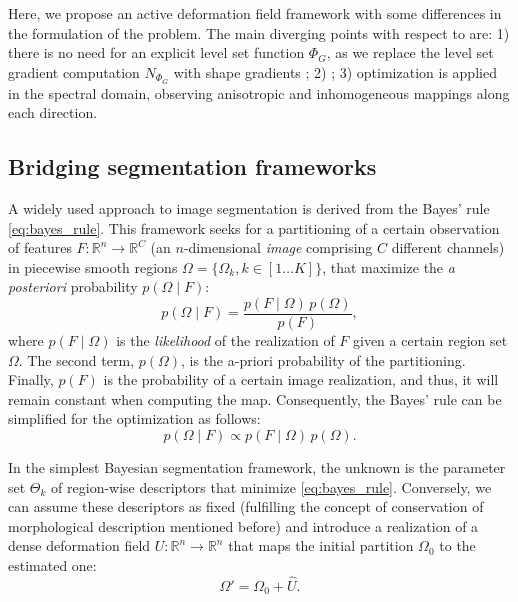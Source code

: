 Here, we propose an active deformation field framework with some differences in
the formulation of the problem. The main diverging points with respect to
\citep{gorthi_active_2011} are: 1) there is no need for an explicit level set function
$\Phi_G$, as we replace the level set gradient computation $N_{\Phi_G}$ with shape
gradients \citep{jehan-besson_dream2s:_2003,herbulot_segmentation_2006}; 2) 
; 3) optimization is applied in the spectral
domain, observing anisotropic and inhomogeneous mappings along each direction.


\subsection{Bridging segmentation frameworks}
\label{sec:methods_map}
%
A widely used approach to image segmentation is derived from the
Bayes' rule \eqref{eq:bayes_rule}. This framework seeks for a 
partitioning of a certain observation of features $F: \mathbb{R}^n \to %
\mathbb{R}^C$ (an $n$-dimensional \emph{image} comprising $C$ different 
channels) in piecewise smooth regions $\Omega = \lbrace \Omega_k , 
k\in\left[ 1 \ldots K \right] \rbrace$,  that maximize the \emph{a posteriori}
probability $p(\Omega \mid F)$:
\begin{equation}
p(\Omega \mid F) = \frac{p(F \mid \Omega)\, p(\Omega)}{p(F)},
\label{eq:bayes_rule}
\end{equation}
where $p(F \mid \Omega)$ is the \emph{likelihood} of the realization 
of $F$ given a certain region set $\Omega$. The second term, $p(\Omega)$,
is the a-priori probability of the partitioning. Finally, $p(F)$ is the 
probability of a certain image realization, and thus, it will remain 
constant when computing the \gls{map}. Consequently, the Bayes' rule
can be simplified for the optimization as follows:
\begin{equation}
p(\Omega \mid F) \propto p(F \mid \Omega)\, p(\Omega).
\label{eq:bayes_rule_simplified}
\end{equation}

In the simplest Bayesian segmentation framework, the unknown is the
parameter set $\Theta_k$ of region-wise descriptors that minimize 
\eqref{eq:bayes_rule}. Conversely, we can assume these descriptors as
fixed (fulfilling the concept of conservation of morphological description
mentioned before) and introduce a realization of a dense deformation field $U: %
\mathbb{R}^n \to \mathbb{R}^n$ that maps the initial partition $\Omega_0$
to the estimated one:
\begin{equation}
\Omega' = \Omega_0 + \hat{U}.
\label{eq:omega_tf}
\end{equation}

